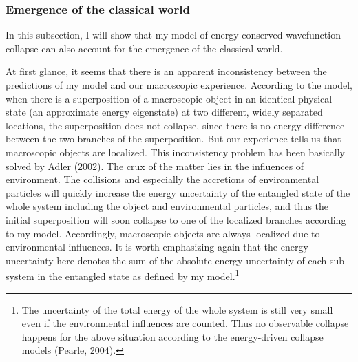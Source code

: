 \subsubsection{Emergence of the classical world}

In this subsection, I will show that my model of energy-conserved wavefunction collapse can also account for the emergence of the classical world.

At first glance, it seems that there is an apparent inconsistency between the predictions of my model and our macroscopic experience. According to the model, when there is a superposition of a macroscopic object in an identical physical state (an approximate energy eigenstate) at two different, widely separated locations, the superposition does not collapse, since there is no energy difference between the two branches of the superposition. But our experience tells us that macroscopic objects are localized. This inconsistency problem has been basically solved by Adler (2002). The crux of the matter lies in the influences of environment. The collisions and especially the accretions of environmental particles will quickly increase the energy uncertainty of the entangled state of the whole system including the object and environmental particles, and thus the initial superposition will soon collapse to one of the localized branches according to my model. Accordingly, macroscopic objects are always localized due to environmental influences. It is worth emphasizing again that the energy uncertainty here denotes the sum of the absolute energy uncertainty of each sub-system in the entangled state as defined by my model.\footnote{The uncertainty of the total energy of the whole system is still very small even if the environmental influences are counted. Thus no observable collapse happens for the above situation according to the energy-driven collapse models (Pearle, 2004).}

